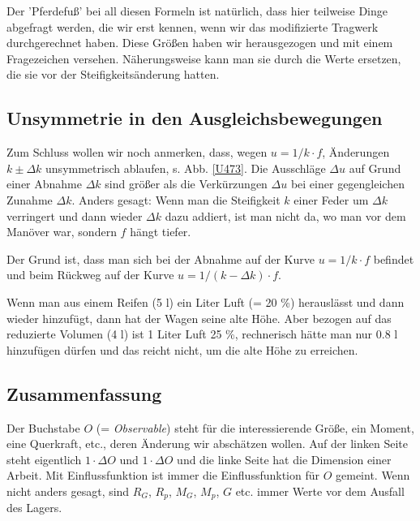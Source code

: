 {{{{{{Der 'Pferdefu{\ss}' bei all diesen Formeln ist nat\"{u}rlich, dass hier teilweise Dinge abgefragt werden, die wir erst kennen, wenn wir das modifizierte Tragwerk durchgerechnet haben. Diese Gr\"{o}{\ss}en haben wir herausgezogen und mit einem Fragezeichen versehen. N\"{a}herungsweise kann man sie durch die Werte ersetzen, die sie vor der Steifigkeits\"{a}nderung hatten.


\textcolor{blau2}{\subsection{Unsymmetrie in den Ausgleichsbewegungen}}
Zum Schluss wollen wir noch anmerken, dass, wegen $u = 1/k \cdot f$, \"{A}nderungen $k \pm \Delta k$ unsymmetrisch ablaufen, s. Abb. \ref{U473}. Die Ausschl\"{a}ge $\Delta u$ auf Grund einer Abnahme $\Delta k$ sind gr\"{o}{\ss}er als die Verk\"{u}rzungen $\Delta u$ bei einer gegengleichen Zunahme $\Delta k$. Anders gesagt: Wenn man die Steifigkeit $k$  einer Feder um $\Delta k$ verringert und dann wieder $\Delta k$ dazu addiert, ist man nicht da, wo man vor dem Man\"{o}ver war, sondern $f$ h\"{a}ngt tiefer.

 Der Grund ist, dass man sich bei der Abnahme auf der Kurve $u = 1/k \cdot f$ befindet und beim R\"{u}ckweg auf der Kurve $u = 1/(k - \Delta k) \cdot f$.

 Wenn man aus einem Reifen (5 l) ein Liter Luft (= 20 \%) herausl\"{a}sst und dann wieder hinzuf\"{u}gt, dann hat der Wagen seine alte H\"{o}he. Aber bezogen auf das reduzierte Volumen (4 l) ist 1 Liter Luft 25 \%, rechnerisch h\"{a}tte man nur 0.8 l hinzuf\"{u}gen d\"{u}rfen und das reicht nicht, um die alte H\"{o}he zu erreichen.

\textcolor{blau2}{\section{Zusammenfassung}}
Der Buchstabe $O$ (= {\em Observable\/}) steht f\"{u}r die interessierende Gr\"{o}{\ss}e, ein Moment, eine Querkraft, etc., deren \"{A}nderung wir absch\"{a}tzen wollen. Auf der linken Seite steht eigentlich $1 \cdot \Delta O$ und $1 \cdot \Delta O$ und die linke Seite hat die Dimension einer Arbeit. Mit Einflussfunktion ist immer die Einflussfunktion f\"{u}r $O$ gemeint. Wenn nicht anders gesagt, sind $R_G$, $R_p$, $M_G$, $M_p$, $G$ etc. immer Werte vor dem Ausfall des Lagers.

}}}}}}
